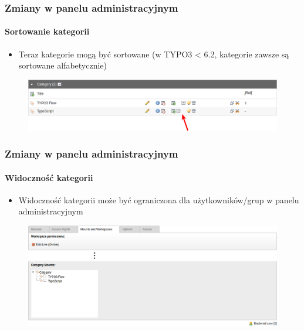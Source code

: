 
\begin{frame}[fragile]
	\frametitle{Zmiany w panelu administracyjnym}
	\framesubtitle{Sortowanie kategorii}

 	\begin{itemize}
		\item Teraz kategorie mogą być sortowane\newline
			\small(w TYPO3 < 6.2, kategorie zawsze są sortowane alfabetycznie)\normalsize
	\end{itemize}

	\begin{figure}
		\includegraphics[width=0.95\linewidth]{Images/BackendChanges/CategorySorting.png}
	\end{figure}

\end{frame}


\begin{frame}[fragile]
	\frametitle{Zmiany w panelu administracyjnym}
	\framesubtitle{Widoczność kategorii}

 	\begin{itemize}
		\item Widoczność kategorii może być ograniczona dla użytkowników/grup w panelu administracyjnym
	\end{itemize}

	\begin{figure}
		\includegraphics[width=0.95\linewidth]{Images/BackendChanges/CategoryVisibility.png}
	\end{figure}

\end{frame}

